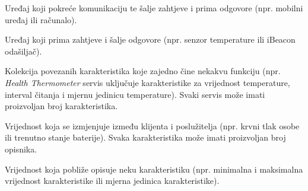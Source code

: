 \begin{description}[style=nextline]
    \item[Klijent] 
        Uređaj koji pokreće komunikaciju te šalje zahtjeve i prima odgovore (npr. mobilni uređaj ili računalo).
    \item[Poslužitelj (server)] 
        Uređaj koji prima zahtjeve i šalje odgovore (npr. senzor temperature ili iBeacon odašiljač).
    \item[Servis] 
        Kolekcija povezanih karakteristika koje zajedno čine nekakvu funkciju (npr. \textit{Health Thermometer} servis uključuje                     karakteristike za vrijednost temperature, interval čitanja i mjernu jedinicu temperature). 
        Svaki servis može imati proizvoljan broj karakteristika.
    \item[Karakteristika\footnote{engl. \textit{Characteristic}}] 
        Vrijednost koja se izmjenjuje između klijenta i poslužitelja (npr. krvni tlak osobe ili trenutno stanje baterije). 
        Svaka karakteristika može imati proizvoljan broj opisnika.
    \item[Opisnik\footnote{engl. \textit{Descriptor}}] 
        Vrijednost koja pobliže opisuje neku karakteristiku (npr. minimalna i maksimalna vrijednost karakteristike ili mjerna jedinica karakteristike).
\end{description}